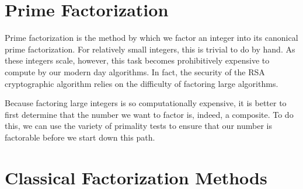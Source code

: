 \documentclass{article}
\begin{document}
\newpage



\section{Prime Factorization}

\par Prime factorization is the method by which we factor an integer into its canonical prime factorization.
For relatively small integers, this is trivial to do by hand. As these integers scale, however, this task
becomes prohibitively expensive to compute by our modern day algorithms. In fact, the security of the RSA
cryptographic algorithm relies on the difficulty of factoring large algorithms.

\par Because factoring large integers is so computationally expensive, it is better to first determine that
the number we want to factor is, indeed, a composite. To do this, we can use the variety of primality tests
to ensure that our number is factorable before we start down this path.

\section{Classical Factorization Methods}
\end{document}

